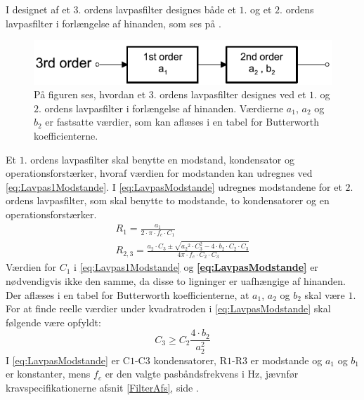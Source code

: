 \noindent I designet af et $3$. ordens lavpasfilter designes både et $1$. og et $2$. ordens lavpasfilter i forlængelse af hinanden, som ses på .
\begin{figure}[H]
	\centering
	\includegraphics[scale=0.7]{figures/cProblemloesning/Filter_Orden.PNG}
	\caption{På figuren ses, hvordan et $3$. ordens lavpasfilter designes ved et $1$. og $2$. ordens lavpasfilter i forlængelse af hinanden. Værdierne $a_{1}$, $a_{2}$ og $b_{2}$ er fastsatte værdier, som kan aflæses i en tabel for Butterworth koefficienterne. \cite{Carter2013}}
	\label{fig:filter_Orden}
\end{figure}
\noindent%
Et $1$. ordens lavpasfilter skal benytte en modstand, kondensator og operationsforstærker, hvoraf værdien for modstanden kan udregnes ved \eqref{eq:Lavpas1Modstande}. I \eqref{eq:LavpasModstande} udregnes modstandene for et $2$. ordens lavpasfilter, som skal benytte to modstande, to kondensatorer og en operationsforstærker. \cite{Carter2013}
\begin{eqnarray} \label{eq:Lavpas1Modstande}
R_{1} = \frac{a_1}{2 \cdot \pi \cdot f_c \cdot C_1} \\ 
\label{eq:LavpasModstande}R_{2,3} = \frac{a_2 \cdot C_3 \pm \sqrt{{a_2}^2 \cdot C_3^2 - 4 \cdot b_2 \cdot C_2 \cdot C_3}}{4 \pi \cdot f_c \cdot C_2 \cdot C_3}
\end{eqnarray}
\noindent Værdien for $C_{1}$ i \eqref{eq:Lavpas1Modstande} og \textbf{\ref{eq:LavpasModstande}} er nødvendigvis ikke den samme, da disse to ligninger er uafhængige af hinanden. Der aflæses i en tabel for Butterworth koefficienterne, at $a_{1}$, $a_{2}$ og $b_{2}$ skal være $1$. For at finde reelle værdier under kvadratroden i \eqref{eq:LavpasModstande} skal følgende være opfyldt:
\begin{equation} \label{eq:kondensator}
C_3 \geq C_2 \frac{4 \cdot b_2}{a_2^2}
\end{equation}
\noindent I \eqref{eq:LavpasModstande} er C$1$-C$3$ kondensatorer, R$1$-R$3$ er modstande og $a_1$ og $b_1$ er konstanter, mens $f_c$ er den valgte pasbåndsfrekvens i Hz, jævnfør kravspecifikationerne afsnit \ref{FilterAfs}, side \pageref{FilterAfs}. 

